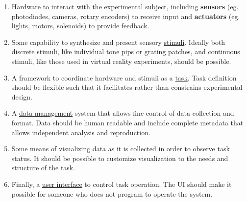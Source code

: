 \documentclass[nohyper, justified, notitlepage, marginals=raggedright,twoside=false,debug]{tufte-autopilot}
\begin{document}
\begin{enumerate}

\item \hyperref[sec:hardware]{Hardware} to interact with the experimental subject, including \textbf{sensors} (eg. photodiodes, cameras, rotary encoders) to receive input and \textbf{actuators} (eg. lights, motors, solenoids) to provide feedback.
\item Some capability to synthesize and present sensory \hyperref[sec:stim]{stimuli}. Ideally both discrete stimuli, like individual tone pips or grating patches, and continuous stimuli, like those used in virtual reality experiments, should be possible.
\item A  framework to coordinate hardware and stimuli as a \hyperref[sec:tasks]{task}. Task definition should be flexible such that it facilitates rather than constrains experimental design.
\item A \hyperref[sec:data]{data management} system that allows fine control of data collection and format. Data should be human readable and include complete metadata that allows independent analysis and reproduction.
\item Some means of \hyperref[sec:plotting]{visualizing data} as it is collected in order to  observe task status. It should be possible to customize visualization to the needs and structure of the task.
\item Finally, a \hyperref[sec:ui]{user interface} to control task operation. The UI should make it possible for someone who does not program to operate the system.
\end{enumerate}
\end{document}
